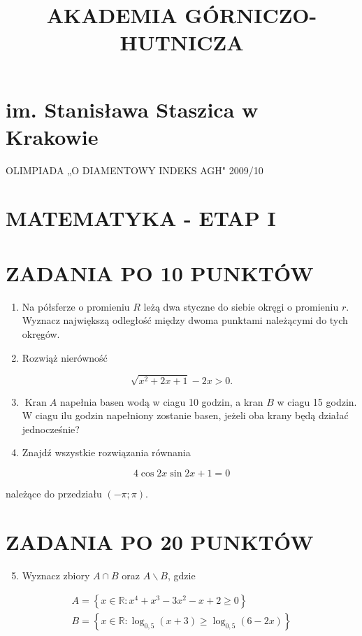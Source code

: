 \documentclass[10pt]{article}
\title{AKADEMIA GÓRNICZO-HUTNICZA }
\author{}
\date{}
\begin{document}
\maketitle
\section*{im. Stanisława Staszica w Krakowie}
OLIMPIADA „O DIAMENTOWY INDEKS AGH" 2009/10

\section*{MATEMATYKA - ETAP I}
\section*{ZADANIA PO 10 PUNKTÓW}
\begin{enumerate}
  \item Na półsferze o promieniu $R$ leżą dwa styczne do siebie okręgi o promieniu $r$. Wyznacz największą odległość między dwoma punktami należącymi do tych okręgów.
  \item Rozwiąż nierówność
\end{enumerate}

$$
\sqrt{x^{2}+2 x+1}-2 x>0 .
$$

\begin{enumerate}
  \setcounter{enumi}{2}
  \item $\operatorname{Kran} A$ napełnia basen wodą w ciagu 10 godzin, a kran $B$ w ciagu 15 godzin. W ciagu ilu godzin napełniony zostanie basen, jeżeli oba krany będą działać jednocześnie?
  \item Znajdź wszystkie rozwiązania równania
\end{enumerate}

$$
4 \cos 2 x \sin 2 x+1=0
$$

należące do przedziału $(-\pi ; \pi)$.

\section*{ZADANIA PO 20 PUNKTÓW}
\begin{enumerate}
  \setcounter{enumi}{4}
  \item Wyznacz zbiory $A \cap B$ oraz $A \backslash B$, gdzie
\end{enumerate}

$$
\begin{gathered}
A=\left\{x \in \mathbb{R}: x^{4}+x^{3}-3 x^{2}-x+2 \geq 0\right\} \\
B=\left\{x \in \mathbb{R}: \log _{0,5}(x+3) \geq \log _{0,5}(6-2 x)\right\}
\end{gathered}
$$
\end{document}
